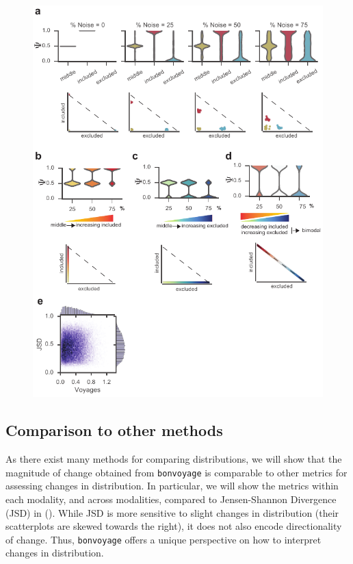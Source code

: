 \begin{figure}[h]
\ContinuedFloat
\captionsetup{labelformat=empty}
\centering
  \includegraphics[width=5.8in]{figures/bonvoyage_simulations}
\end{figure}
\addtocounter{figure}{1}
\clearpage

\subsection{Comparison to other methods}

As there exist many methods for comparing distributions, we will show that the magnitude of change obtained from \texttt{bonvoyage} is comparable to other metrics for assessing changes in distribution. In particular, we will show the metrics within each modality, and across modalities, compared to Jensen-Shannon Divergence \cite{Cover:2011vn} (JSD) in (). While JSD is more sensitive to slight changes in distribution (their scatterplots are skewed towards the right), it does not also encode directionality of change. Thus, \texttt{bonvoyage} offers a unique perspective on how to interpret changes in distribution.

